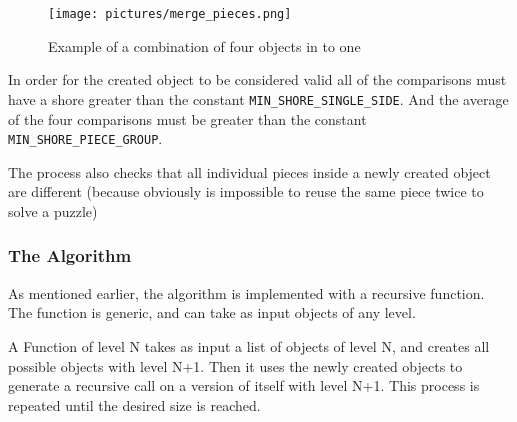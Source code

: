 \documentclass{article}
\begin{document}
\begin{figure}[H]
  \caption{Example of a combination of four objects in to one}\label{fig:merge_pieces}
  \centering
  \texttt{[image: pictures/merge\_pieces.png]}
\end{figure}

In order for the created object to be considered valid all of the comparisons must have a shore greater
than the constant \texttt{MIN\_SHORE\_SINGLE\_SIDE}. And the average of the four comparisons must be greater
than the constant \texttt{MIN\_SHORE\_PIECE\_GROUP}.

The process also checks that all individual pieces inside a newly
created object are different (because obviously is impossible to reuse the same piece twice to solve a puzzle)
\subsubsection{The Algorithm}

As mentioned earlier, the algorithm is implemented with a recursive function.
The function is generic, and can take as input objects of any level.

A Function of level N takes as input a list of objects of level N,
and creates all possible objects with level N+1.
Then it uses the newly created objects to generate a recursive call on a version
of itself with level N+1.
This process is repeated until the desired size is reached.
\end{document}
